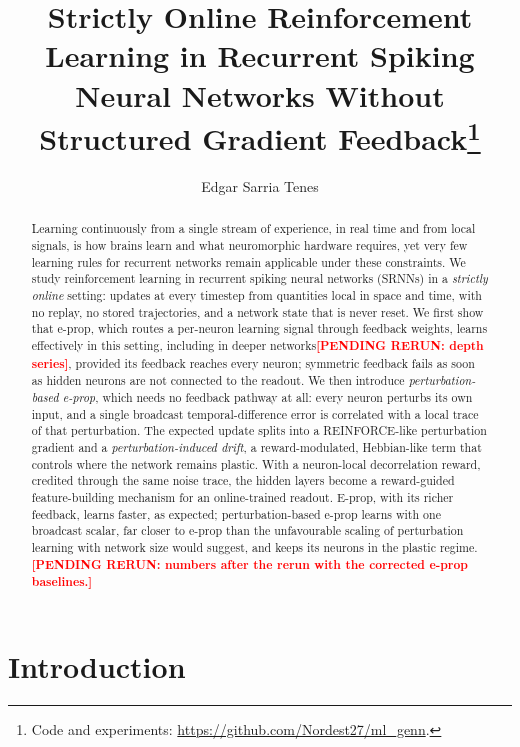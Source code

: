 \documentclass[10pt,twocolumn]{article}
\title{\sffamily\bfseries Strictly Online Reinforcement Learning in Recurrent Spiking
Neural Networks Without Structured Gradient Feedback\thanks{Code and experiments: \url{https://github.com/Nordest27/ml_genn}.}}
\author[1]{Edgar Sarria Tenes}
\affil[1]{Affiliation \\ \texttt{edgar.sarria@estudiantat.upc.edu}}
\date{}
\newcommand{\pending}[1]{\textcolor{red}{\bfseries[PENDING RERUN#1]}}
\newcommand{\method}{perturbation-based e-prop}   %
\begin{document}
\maketitle

\begin{abstract}
Learning continuously from a single stream of experience, in real time and from
local signals, is how brains learn and what neuromorphic hardware requires, yet
very few learning rules for recurrent networks remain applicable under these
constraints. We study reinforcement learning in recurrent spiking neural networks
(SRNNs) in a \emph{strictly online} setting: updates at every timestep from
quantities local in space and time, with no replay, no stored trajectories, and a
network state that is never reset. We first show that e-prop, which
routes a per-neuron learning signal through feedback weights, learns effectively in
this setting, including in deeper networks\pending{: depth series}, provided its
feedback reaches every neuron; symmetric feedback fails as soon as hidden neurons
are not connected to the readout. We then introduce \emph{\method{}}, which needs no
feedback pathway at all: every neuron perturbs its own input, and a single broadcast
temporal-difference error is correlated with a local trace of that perturbation. The
expected update splits into a REINFORCE-like perturbation gradient and a
\emph{perturbation-induced drift}, a reward-modulated, Hebbian-like term that
controls where the network remains plastic. With a neuron-local decorrelation reward,
credited through the same noise trace, the hidden layers become a reward-guided
feature-building mechanism for an online-trained readout. E-prop, with its richer feedback, learns
faster, as expected; \method{} learns with one broadcast scalar, far closer to e-prop
than the unfavourable scaling of perturbation learning with network size would
suggest, and keeps its neurons in the plastic regime.\pending{: numbers after the
rerun with the corrected e-prop baselines.}
\end{abstract}

\section{Introduction}
\label{sec:intro}
\end{document}
